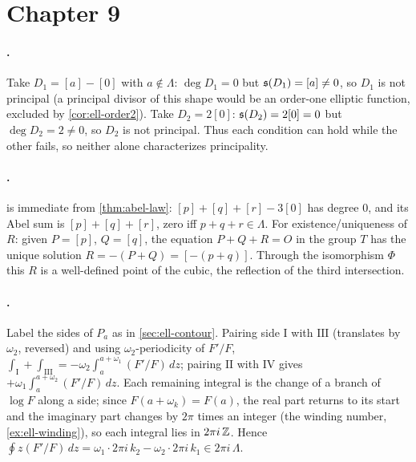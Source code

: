 \section{Chapter 9}
\label{sec:soln-ch9}

\paragraph{.}
Take \(D_1 = [a] - [0]\) with \(a \notin \Lambda\): \(\deg D_1 = 0\) but
\(\mathfrak{s}(D_1) = [a] \ne 0\), so \(D_1\) is not principal (a principal divisor of
this shape would be an order-one elliptic function, excluded by
\cref{cor:ell-order2}). Take \(D_2 = 2[0]\): \(\mathfrak{s}(D_2) = 2[0] = 0\) but
\(\deg D_2 = 2 \ne 0\), so \(D_2\) is not principal. Thus each condition can hold
while the other fails, so neither alone characterizes principality.

\paragraph{.}
 is immediate from \cref{thm:abel-law}:
\([p]+[q]+[r]-3[0]\) has degree \(0\), and its Abel sum is \([p]+[q]+[r]\), zero
iff \(p+q+r \in \Lambda\). For existence/uniqueness of \(R\): given \(P = [p]\),
\(Q = [q]\), the equation \(P + Q + R = O\) in the group \(T\) has the unique
solution \(R = -(P+Q) = [-(p+q)]\). Through the isomorphism \(\Phi\) this \(R\) is
a well-defined point of the cubic, the reflection of the third intersection.

\paragraph{.}
Label the sides of \(P_a\) as in \cref{sec:ell-contour}. Pairing side
\(\mathrm{I}\) with \(\mathrm{III}\) (translates by \(\omega_2\), reversed) and
using \(\omega_2\)-periodicity of \(F'/F\),
\(\int_{\mathrm{I}} + \int_{\mathrm{III}} = -\omega_2 \int_{a}^{a+\omega_1}
(F'/F)\,dz\); pairing \(\mathrm{II}\) with \(\mathrm{IV}\) gives
\(+\omega_1 \int_{a}^{a+\omega_2}(F'/F)\,dz\). Each remaining integral is the
change of a branch of \(\log F\) along a side; since \(F(a+\omega_k) = F(a)\), the
real part returns to its start and the imaginary part changes by \(2\pi\) times an
integer (the winding number, \cref{ex:ell-winding}), so each integral lies in
\(2\pi i\,\mathbb{Z}\). Hence \(\oint z(F'/F)\,dz = \omega_1\cdot 2\pi i\,k_2 - \omega_2
\cdot 2\pi i\,k_1 \in 2\pi i\,\Lambda\).

